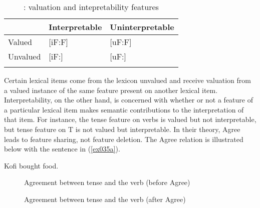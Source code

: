 \documentclass[output=paper,colorlinks,citecolor=brown]{langscibook}
\begin{document}
\begin{table}[b]
\caption{\label{tab:owusu:ex23}\citet{PesetskyTorrego2007}: valuation and intepretability features}
\begin{tabular}{lll}
\lsptoprule
& Interpretable & Uninterpretable\\
\midrule
Valued & [iF:F] & [uF:F]\\
Unvalued & [iF:] & [uF:]\\
\lspbottomrule
\end{tabular}
\end{table}

Certain lexical items come from the lexicon unvalued and receive valuation from a valued instance of the same feature present on another lexical item. Interpretability, on the other hand, is concerned with whether or not a feature of a particular lexical item makes semantic contributions to the interpretation of that item. For instance, the tense feature on verbs is valued but not interpretable, but tense feature on T is not valued but interpretable. In their theory, Agree leads to feature sharing, not feature deletion. The Agree relation is illustrated below with the sentence in (\ref{ex035a}).

\ea \label{ex035a}
Kofi bought food. 
\z

\begin{figure}  
\caption{Agreement between tense and the verb  (before Agree)}
\end{figure}
\begin{figure}
\caption{Agreement between tense and the verb (after Agree)}
\end{figure}
 
\end{document}
